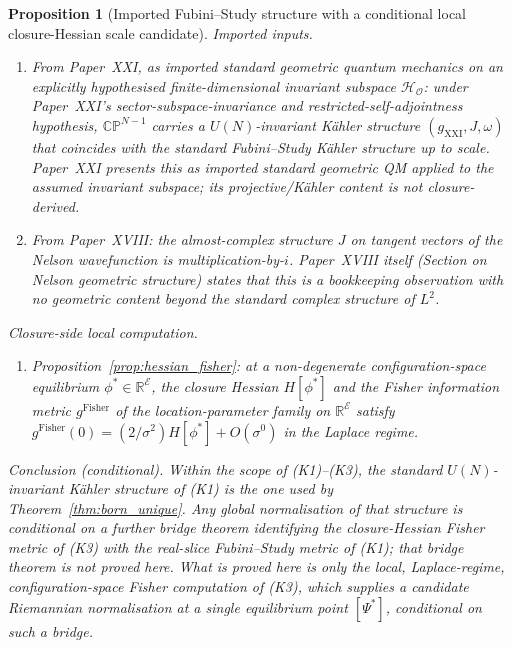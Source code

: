 \documentclass[12pt]{article}
\newtheorem{proposition}[theorem]{Proposition}
\newcommand{\Ecal}{\mathcal{E}}
\newcommand{\Ocal}{\mathcal{O}}
\newcommand{\Hcal}{\mathcal{H}}
\begin{document}
\begin{proposition}[Imported Fubini--Study structure with a conditional local closure-Hessian scale candidate]\label{prop:fs_assembly}
\emph{Imported inputs.}
\begin{enumerate}
    \item[\textbf{(K1)}] \emph{From Paper~XXI}, as imported standard geometric quantum mechanics on an explicitly hypothesised finite-dimensional invariant subspace $\Hcal_\Ocal$: under Paper~XXI's sector-subspace-invariance and restricted-self-adjointness hypothesis, $\mathbb{CP}^{N-1}$ carries a $U(N)$-invariant K\"ahler structure $(g_{\mathrm{XXI}}, J, \omega)$ that coincides with the standard Fubini--Study K\"ahler structure up to scale. Paper~XXI presents this as imported standard geometric QM applied to the assumed invariant subspace; its projective/K\"ahler content is not closure-derived.
    \item[\textbf{(K2)}] \emph{From Paper~XVIII}: the almost-complex structure $J$ on tangent vectors of the Nelson wavefunction is multiplication-by-$i$. Paper~XVIII itself (Section on Nelson geometric structure) states that this is a bookkeeping observation with no geometric content beyond the standard complex structure of $L^2$.
\end{enumerate}
\emph{Closure-side local computation.}
\begin{enumerate}
    \item[\textbf{(K3)}] Proposition~\ref{prop:hessian_fisher}: at a non-degenerate configuration-space equilibrium $\phi^* \in \mathbb{R}^\Ecal$, the closure Hessian $H[\phi^*]$ and the Fisher information metric $g^{\mathrm{Fisher}}$ of the location-parameter family on $\mathbb{R}^\Ecal$ satisfy $g^{\mathrm{Fisher}}(0) = (2/\sigma^2) H[\phi^*] + O(\sigma^0)$ in the Laplace regime.
\end{enumerate}
\emph{Conclusion (conditional).} Within the scope of (K1)--(K3), the standard $U(N)$-invariant K\"ahler structure of (K1) is the one used by Theorem~\ref{thm:born_unique}. Any global normalisation of that structure is conditional on a further bridge theorem identifying the closure-Hessian Fisher metric of (K3) with the real-slice Fubini--Study metric of (K1); that bridge theorem is not proved here. What is proved here is only the local, Laplace-regime, configuration-space Fisher computation of (K3), which supplies a \emph{candidate} Riemannian normalisation at a single equilibrium point $[\Psi^*]$, \emph{conditional} on such a bridge.
\end{proposition}
\end{document}
